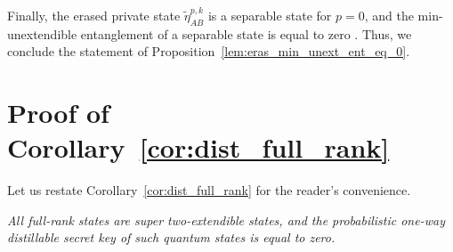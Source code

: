 \documentclass[twocolumn,letterpaper, dvipsnames,allowtoday, accepted = 2025-12-31]{quantumarticle}
\begin{document}
    Finally, the erased private state $\widetilde{\eta}^{p,k}_{AB}$ is a separable state for $p=0$, and the min-unextendible entanglement of a separable state is equal to zero \cite[Proposition~3]{WWW21}. Thus, we conclude the statement of Proposition~\ref{lem:eras_min_unext_ent_eq_0}. 



\section{Proof of Corollary~\ref{cor:dist_full_rank}}\label{app:dist_full_rank}

Let us restate Corollary~\ref{cor:dist_full_rank} for the reader's convenience.

\emph{All full-rank states are super two-extendible
states, and the probabilistic one-way distillable secret
key of such quantum states is equal to zero.}

\medskip
\end{document}
